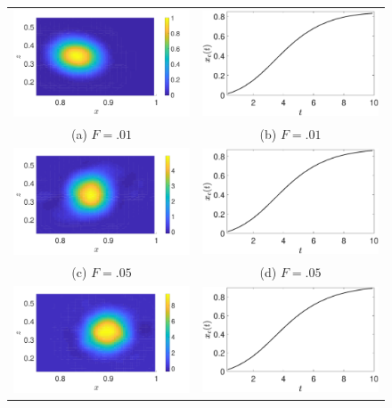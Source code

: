 \documentclass[a4paper,11pt]{article}
\begin{document}
\begin{figure}
\centering
\begin{tabular}{cc}
\includegraphics[width=.45\textwidth]{vorticity_wm_1_modu_pt9} &  \includegraphics[width=.45\textwidth]{com_wm_1_modu_pt9}\\
(a) $F=.01$ & (b) $F=.01$\\
\includegraphics[width=.45\textwidth]{vorticity_wm_5_modu_pt9} & \includegraphics[width=.45\textwidth]{com_wm_5_modu_pt9}\\
(c) $F=.05$ & (d) $F=.05$\\
 \includegraphics[width=.45\textwidth]{vorticity_wm_10_modu_pt9} & \includegraphics[width=.45\textwidth]{com_wm_10_modu_pt9}\\

\end{tabular}
\end{figure}
\end{document}
